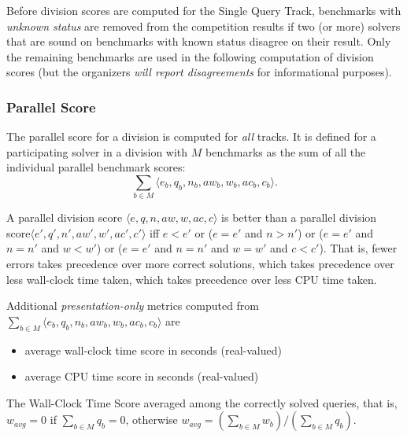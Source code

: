 \documentclass[12pt]{article}
\newcommand{\maintrack}{Single Query Track\xspace}
\begin{document}
Before division scores are computed for the \maintrack{},
benchmarks with \emph{unknown status} are removed from the competition results
if two (or more) solvers that are sound on benchmarks with known status
disagree on their result.
%
Only the remaining benchmarks are used in the following computation of division
scores (but the organizers \emph{will report disagreements} for informational
purposes).


\subsubsection{Parallel Score}

The parallel score for a division is computed for \emph{all} tracks.  It is
defined for a participating solver in a division with $M$ benchmarks as the sum
of all the individual parallel benchmark scores:
$$\sum_{b\in M} \langle e_b , q_b, n_b , \mathit{aw}_b, w_b, \mathit{ac}_b, c_b\rangle.$$

\noindent
A parallel division score $\langle
e, q, n, \mathit{aw}, w, \mathit{ac}, c\rangle$ is better than a parallel
division score\newline $\langle e', q', n', \mathit{aw}', w', \mathit{ac}', c'\rangle$
iff $e < e'$ or ($e = e'$ and $n
> n'$) or ($e = e'$ and $n = n'$ and $w < w'$) or ($e = e'$ and $n = n'$ and $w
= w'$ and $c < c'$).  That is, fewer errors takes precedence over more correct
solutions, which takes precedence over less wall-clock time taken, which takes
precedence over less CPU time taken.

Additional \emph{presentation-only} metrics computed from
$\sum_{b\in M} \langle e_b , q_b, n_b , \mathit{aw}_b, w_b, \mathit{ac}_b, c_b\rangle$
are
\begin{itemize}[noitemsep]
  \vspace{-1ex}
  \item {}
    average wall-clock time score in seconds (real-valued)
  \item {}
    average CPU time score in seconds (real-valued)
\end{itemize}

The Wall-Clock Time Score averaged among the correctly solved queries,
that is,
$w_{avg} = 0$ if $\sum_{b\in M} q_b = 0$,
otherwise $w_{avg} = (\sum_{b\in M} w_b)/(\sum_{b\in M} q_b)$.
\end{document}
